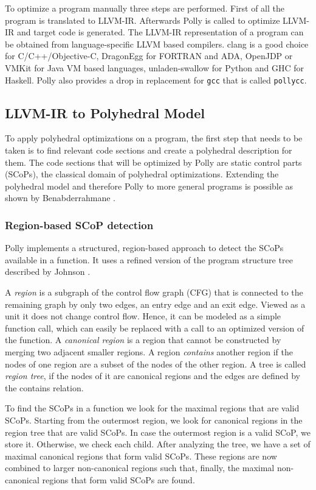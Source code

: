 To optimize a program manually three steps are performed. First of all the
program is translated to LLVM-IR. Afterwards Polly is called to optimize LLVM-IR and
target code is generated. The LLVM-IR representation of a program can
be obtained from language-specific LLVM based compilers. clang is a
good choice for C/C++/Objective-C, DragonEgg for FORTRAN and ADA, OpenJDP or
VMKit for Java VM based languages, unladen-swallow for Python and GHC for
Haskell. Polly also provides a drop in replacement for \texttt{gcc} that is
called \texttt{pollycc}.

\subsection{LLVM-IR to Polyhedral Model}

To apply polyhedral optimizations on a program, the first step that needs to be
taken is to find relevant code sections and create a polyhedral description for
them. The code sections that will be optimized by Polly are static
control parts (SCoPs), the classical domain of polyhedral optimizations.
Extending the polyhedral model and therefore Polly to more general programs is
possible as shown by Benabderrahmane \cite{benabderrahmane.10.cc}.

\subsubsection{Region-based SCoP detection}
Polly implements a structured, region-based approach to detect
the SCoPs available in a function. It uses a refined version of the program
structure tree described by Johnson \cite{Johnson}.

A \emph{region} is a subgraph of the control flow graph (CFG) that is connected to the
remaining graph by only two edges, an entry edge and an exit edge.  Viewed as a
unit it does not change control flow. Hence, it can be modeled as a
simple function call, which can easily be replaced with a call to an optimized
version of the function.  A \emph{canonical region} is a region that cannot be
constructed by merging two adjacent smaller regions. A region \emph{contains}
another region if the nodes of one region are a subset of the nodes of the other
region. A tree is called \emph{region tree}, if the nodes of it are canonical regions
and the edges are defined by the contains relation.

To find the SCoPs in a function we look for the maximal regions that are valid
SCoPs. Starting from the outermost region, we look for canonical regions in the
region tree that are valid SCoPs. In case the outermost region is a valid SCoP,
we store it. Otherwise, we check each child. After analyzing the tree, we have a
set of maximal canonical regions that form valid SCoPs. These regions are now
combined to larger non-canonical regions such that, finally, the maximal 
non-canonical regions that form valid SCoPs are found.

